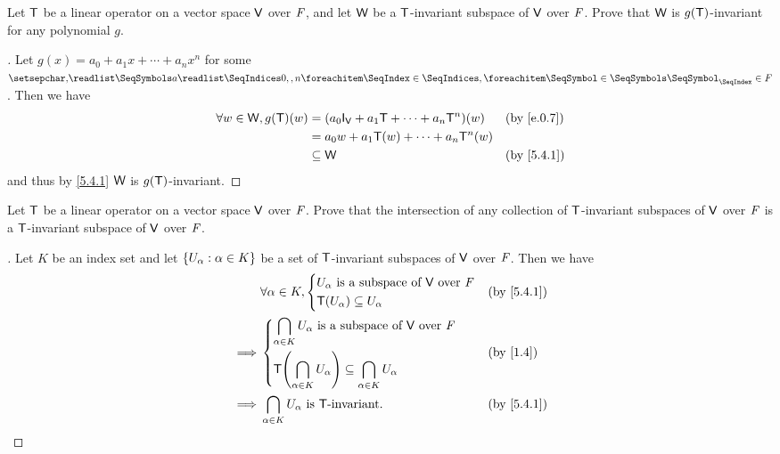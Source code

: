 \exercisesection

\setcounter{ex}{3}
\begin{ex}\label{ex:5.4.4}
	Let \(\mathsf{T}\) be a linear operator on a vector space \(\mathsf{V}\) over \(\mathit{F}\), and let \(\mathsf{W}\) be a \(\mathsf{T}\)-invariant subspace of \(\mathsf{V}\) over \(\mathit{F}\).
	Prove that \(\mathsf{W}\) is \(g(\mathsf{T})\)-invariant for any polynomial \(g\).
\end{ex}

\begin{proof}[]
	Let \(g(x) = a_0 + a_1 x + \cdots + a_n x^n\) for some \(\seq{a}{0,,n} \in \F\).
	Then we have
	\begin{align*}
		\forall w \in \W, g(\T)(w) & = (a_0 \IT[\V] + a_1 \T + \cdots + a_n \T^n)(w) &  & \by{e.0.7} \\
		                           & = a_0 w + a_1 \T(w) + \cdots + a_n \T^n(w)                      \\
		                           & \subseteq \W                                    &  & \by{5.4.1}
	\end{align*}
	and thus by \cref{5.4.1} \(\mathsf{W}\) is \(g(\mathsf{T})\)-invariant.
\end{proof}

\begin{ex}\label{ex:5.4.5}
	Let \(\mathsf{T}\) be a linear operator on a vector space \(\mathsf{V}\) over \(\mathit{F}\).
	Prove that the intersection of any collection of \(\mathsf{T}\)-invariant subspaces of \(\mathsf{V}\) over \(\mathit{F}\) is a \(\mathsf{T}\)-invariant subspace of \(\mathsf{V}\) over \(\mathit{F}\).
\end{ex}

\begin{proof}[]
	Let \(K\) be an index set and let \(\left\lbrace U_{\alpha} : \alpha \in K\right\rbrace\) be a set of \(\mathsf{T}\)-invariant subspaces of \(\mathsf{V}\) over \(\mathit{F}\).
	Then we have
	\begin{align*}
		         & \forall \alpha \in K, \begin{dcases}
			                                 U_{\alpha} \text{ is a subspace of } \V \text{ over } \F \\
			                                 \T(U_{\alpha}) \subseteq U_{\alpha}
		                                 \end{dcases}                                               &  & \by{5.4.1}                          \\
		\implies & \begin{dcases}
			           \bigcap_{\alpha \in K} U_{\alpha} \text{ is a subspace of } \V \text{ over } \F \\
			           \T\pa{\bigcap_{\alpha \in K} U_{\alpha}} \subseteq \bigcap_{\alpha \in K} U_{\alpha}
		           \end{dcases} &  & \by{1.4}                  \\
		\implies & \bigcap_{\alpha \in K} U_{\alpha} \text{ is } \T\text{-invariant}.                                        &  & \by{5.4.1}
	\end{align*}
\end{proof}

